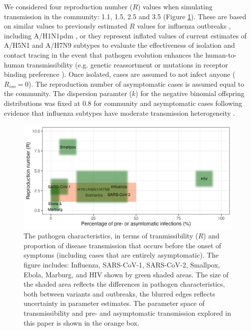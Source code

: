 \documentclass{article}
\begin{document}
We considered four reproduction number ($R$) values when simulating transmission in the community: 1.1, 1.5, 2.5 and 3.5 (Figure \ref{fig:patho-param-space}). These are based on similar values to previously estimated $R$ values for influenza outbreaks \citep{fergusonStrategiesMitigatingInfluenza2006}, including A/H1N1pdm \citep{fraserPandemicPotentialStrain2009, lesslerOutbreak2009Pandemic2009}, or they represent inflated values of current estimates of A/H5N1 and A/H7N9 subtypes to evaluate the effectiveness of isolation and contact tracing in the event that pathogen evolution enhances the human-to-human transmissibility (e.g. genetic reassortment \citep{peacockGlobalH5N1Influenza2025} or mutations in receptor binding preference \citep{linSingleMutationBovine2024}). Once isolated, cases are assumed to not infect anyone ($R_{iso} = 0$). The reproduction number of asymptomatic cases is assumed equal to the community. The dispersion paramter ($k$) for the negative binomial offspring distributions was fixed at 0.8 for community and asymptomatic cases following evidence that influenza subtypes have moderate transmission heterogeneity \citep{fraserPandemicPotentialStrain2009, heComparingCOVID191918192020, Ward2024.12.11.24318702}.

\begin{figure}[ht]
\centering
\includegraphics[width=\textwidth]{../plots/patho_param_space.png}
\caption{The pathogen characteristics, in terms of tranmissibility ($R$) and proportion of disease transmission that occurs before the onset of symptoms (including cases that are entirely asymptomatic). The figure includes: Influenza, SARS-CoV-1, SARS-CoV-2, Smallpox, Ebola, Marburg, and HIV shown by green shaded areas. The size of the shaded area reflects the differences in pathogen characteristics, both between variants and outbreaks, the blurred edges reflects uncertainty in parameter estimates. The parameter space of transmissibility and pre- and asymptomatic transmission explored in this paper is shown in the orange box.}
\label{fig:patho-param-space}
\end{figure}
\end{document}
